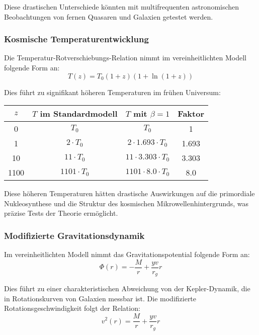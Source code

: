 \documentclass[12pt,a4paper]{article}
\begin{document}
	Diese drastischen Unterschiede könnten mit multifrequenten astronomischen Beobachtungen von fernen Quasaren und Galaxien getestet werden.
	
	\subsubsection{Kosmische Temperaturentwicklung}
	
	Die Temperatur-Rotverschiebungs-Relation nimmt im vereinheitlichten Modell folgende Form an:
	\begin{equation}
		T(z) = T_0 (1+z)(1+\ln(1+z))
	\end{equation}
	
	Dies führt zu signifikant höheren Temperaturen im frühen Universum:
	
	\begin{center}
		\begin{tabular}{|c|c|c|c|}
			\hline
			$z$ & $T$ im Standardmodell & $T$ mit $\beta = 1$ & Faktor \\
			\hline
			0 & $T_0$ & $T_0$ & 1 \\
			1 & $2 \cdot T_0$ & $2 \cdot 1.693 \cdot T_0$ & 1.693 \\
			10 & $11 \cdot T_0$ & $11 \cdot 3.303 \cdot T_0$ & 3.303 \\
			1100 & $1101 \cdot T_0$ & $1101 \cdot 8.0 \cdot T_0$ & 8.0 \\
			\hline
		\end{tabular}
	\end{center}
	
	Diese höheren Temperaturen hätten drastische Auswirkungen auf die primordiale Nukleosynthese und die Struktur des kosmischen Mikrowellenhintergrunds, was präzise Tests der Theorie ermöglicht.
	
	\subsubsection{Modifizierte Gravitationsdynamik}
	
	Im vereinheitlichten Modell nimmt das Gravitationspotential folgende Form an:
	\begin{equation}
		\Phi(r) = -\frac{M}{r} + \frac{y v}{r_g} r
	\end{equation}
	
	Dies führt zu einer charakteristischen Abweichung von der Kepler-Dynamik, die in Rotationskurven von Galaxien messbar ist. Die modifizierte Rotationsgeschwindigkeit folgt der Relation:
	\begin{equation}
		v^2(r) = \frac{M}{r} + \frac{y v}{r_g} r
	\end{equation}
	
\end{document}
